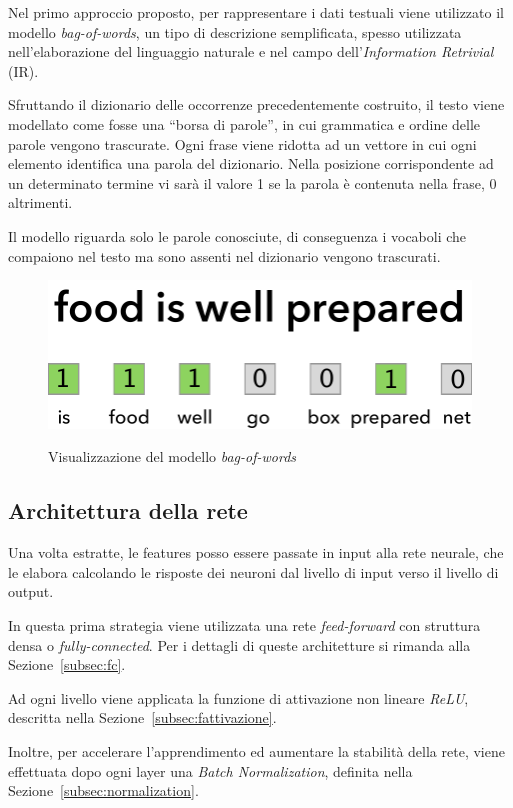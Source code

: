 Nel primo approccio proposto, per rappresentare i dati testuali viene utilizzato il modello \emph{bag-of-words}, un tipo di descrizione semplificata, spesso utilizzata nell'elaborazione del linguaggio naturale e nel campo dell'\emph{Information Retrivial} (IR). 

Sfruttando il dizionario delle occorrenze precedentemente costruito, il testo viene modellato  come fosse una ``borsa di parole'', in cui grammatica e ordine delle parole vengono trascurate.
Ogni frase viene ridotta ad un vettore in cui ogni elemento identifica una parola del dizionario. Nella posizione corrispondente ad un determinato termine vi sarà il valore 1 se la parola è contenuta nella frase, 0 altrimenti.

Il modello riguarda solo le parole conosciute, di conseguenza i vocaboli che compaiono nel testo ma sono assenti nel dizionario vengono trascurati.

\begin{figure}[H]
	\centering
	{\includegraphics[width=.6\textwidth]{images/bow}}
	\caption{Visualizzazione del modello \emph{bag-of-words}}
	\label{fig:bow}
\end{figure}

\subsection{Architettura della rete}
\label{subsec:modelli1}

Una volta estratte, le features posso essere passate in input alla rete neurale, che le elabora calcolando le risposte dei neuroni dal livello di input verso il livello di output.

In questa prima strategia viene utilizzata una rete \emph{feed-forward} con struttura densa o \emph{fully-connected}. Per i dettagli di queste architetture si rimanda alla Sezione~\ref{subsec:fc}.

Ad ogni livello viene applicata la funzione di attivazione non lineare \emph{ReLU}, descritta nella Sezione~\ref{subsec:fattivazione}.

Inoltre, per accelerare l'apprendimento ed aumentare la stabilità della rete, viene effettuata dopo ogni layer una \emph{Batch Normalization}, definita nella Sezione~\ref{subsec:normalization}. 

